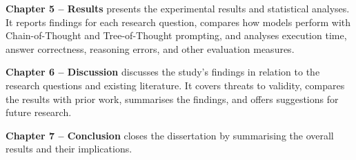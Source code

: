 \textbf{Chapter 5 -- Results} presents the experimental results and
statistical analyses. It reports findings for each research question,
compares how models perform with Chain-of-Thought and Tree-of-Thought
prompting, and analyses execution time, answer correctness, reasoning
errors, and other evaluation measures.

\textbf{Chapter 6 -- Discussion} discusses the study's findings in
relation to the research questions and existing literature. It covers
threats to validity, compares the results with prior work, summarises
the findings, and offers suggestions for future research.

\textbf{Chapter 7 -- Conclusion} closes the dissertation by summarising
the overall results and their implications.
